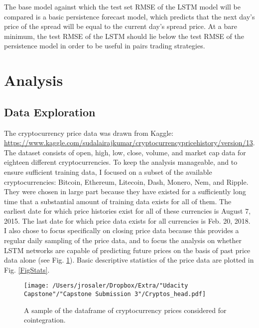 \documentclass{article}
\begin{document}
 The base model against which the test set RMSE of the LSTM model will be compared is a basic persistence forecast model, which predicts that the next day's price of the spread will be equal to the current day's spread price. At a bare minimum, the test RMSE of the LSTM should lie below the test RMSE of the persistence model in order to be useful in pairs trading strategies. 








\section{Analysis}

\subsection{Data Exploration}

The cryptocurrency price data was drawn from Kaggle: \url{https://www.kaggle.com/sudalairajkumar/cryptocurrencypricehistory/version/13}. The dataset consists of open, high, low, close, volume, and market cap data for eighteen different cryptocurrencies. 
To keep the analysis manageable, and to ensure sufficient training data, I focused on a subset of the available cryptocurrencies: Bitcoin, Ethereum, Litecoin, Dash, Monero, Nem, and Ripple. They were chosen in large part because they have existed for a sufficiently long time that a substantial amount of training data exists for all of them. The earliest date for which price histories exist for all of these currencies is August 7, 2015. The last date for which price data exists for all currencies is Feb. 20, 2018. I also chose to focus specifically on closing price data because this provides a regular daily sampling of the price data, and to focus the analysis on whether LSTM networks are capable of predicting future prices on the basis of past price data alone (see Fig. \ref{FigSample}). Basic descriptive statistics of the price data are plotted in Fig. \ref{FigStats}.






\begin{figure}[]
\texttt{[image: /Users/jrosaler/Dropbox/Extra/"Udacity Capstone"/"Capstone Submission 3"/Cryptos\_head.pdf]}
\caption{A sample of the dataframe of cryptocurrency prices considered for cointegration. }
\label{FigSample}
\end{figure}
\end{document}
